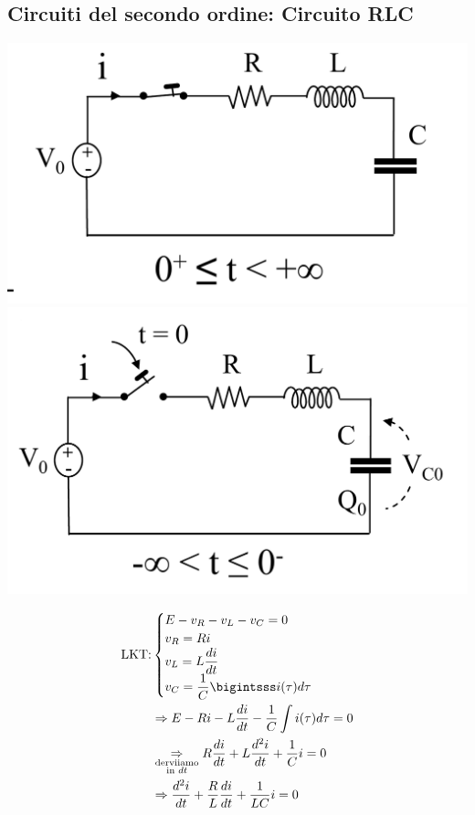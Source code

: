 \documentclass{article}
\begin{document}
\subsection{Circuiti del secondo ordine: Circuito RLC}
\begin{center}
    \includegraphics[scale=0.25]{Image/RLC_0.png}
    \includegraphics[scale=0.25]{Image/RLC_1.png}
\end{center}
\begin{align*}
    \T{LKT:}
    &\begin{cases}
        E-v_R-v_L-v_C=0\\
        v_R = R i \\
        v_L = L \dfrac{di}{dt}\\
        v_C = \dfrac{1}{C} \bigintsss i(\tau) d \tau
    \end{cases}\\
    &\Rightarrow E - R i - L \frac{di}{dt} - \frac{1}{C} \int i(\tau) d \tau = 0\\
    &\underset{\substack{\T{derviiamo}\\ \T{in }dt}}{\Rightarrow} R \frac{di}{dt} + L \frac{d^2i}{dt} + \frac{1}{C}i = 0\\
    &\Rightarrow \frac{d^2i}{dt} + \frac{R}{L} \frac{di}{dt} + \frac{1}{LC}i = 0
\end{align*}
\end{document}

